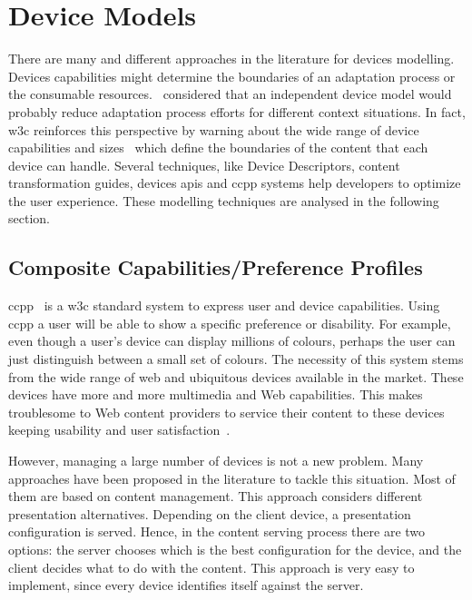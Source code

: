 
\section{Device Models}
\label{sec:devices}

There are many and different approaches in the literature for devices modelling.
Devices capabilities might determine the boundaries of an adaptation process or
the consumable resources.~\citet{lemlouma_context_aware_2004} considered that
an independent device model would probably reduce adaptation process efforts for
different context situations. In fact, \ac{w3c} reinforces this perspective
by warning about the wide range of device capabilities and 
sizes~\citep{device_independence} which define the boundaries of the content
that each device can handle. Several techniques, like Device Descriptors, content
transformation guides, devices \acp{api} and \ac{ccpp} systems help developers 
to optimize the user experience. These modelling techniques are analysed in the 
following section. 

\subsection{Composite Capabilities/Preference Profiles}
\label{sec:ccpp}
\ac{ccpp}~\citep{ccpp_status} is a \ac{w3c} standard system to express user and 
device capabilities. Using \ac{ccpp} a user will be able to show a specific 
preference or disability. For example, even though a user's device can display 
millions of colours, perhaps the user can just distinguish between a small set 
of colours. The necessity of this system stems from the wide range of web and 
ubiquitous devices available in the market. These devices have more and more 
multimedia and Web capabilities. This makes troublesome to Web content providers 
to service their content to these devices keeping usability and user 
satisfaction~\citep{lemlouma_context_aware_2004}. 

However, managing a large number of devices is not a new problem. Many approaches 
have been proposed in the literature to tackle this situation. Most of them are 
based on content management. This approach considers different presentation 
alternatives. Depending on the client device, a presentation configuration is 
served. Hence, in the content serving process there are two options: the 
server chooses which is the best configuration for the device, and the client 
decides what to do with the content. This approach is very easy to implement, 
since every device identifies itself against the server.

